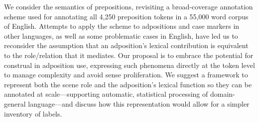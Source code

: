 We consider the semantics of prepositions, revisiting a broad-coverage annotation scheme used for annotating all 4,250 preposition tokens in a 55,000 word corpus of English. Attempts to apply the scheme to adpositions and case markers in other languages, as well as some problematic cases in English, have led us to reconsider the assumption that an adposition's lexical contribution is equivalent to the role/relation that it mediates. Our proposal is to embrace the potential for construal in adposition use, expressing such phenomena directly at the token level to manage complexity and avoid sense proliferation. We suggest a framework to represent both the scene role and the adposition's lexical function so they can be annotated at scale—supporting automatic, statistical processing of domain-general language—and discuss how this representation would allow for a simpler inventory of labels.
